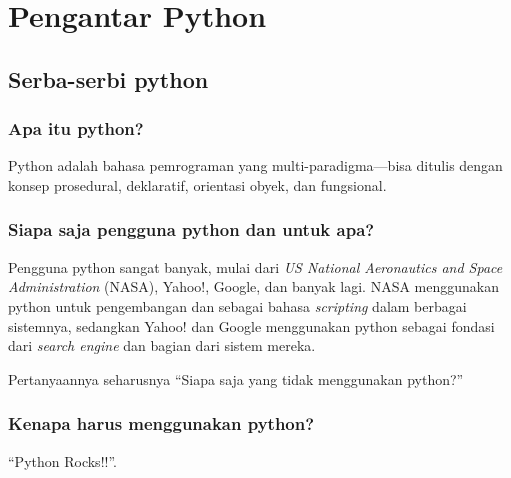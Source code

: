 \chapter{Pengantar Python}

\section{Serba-serbi python}
\subsection{Apa itu python?}
Python adalah bahasa pemrograman yang multi-paradigma---bisa ditulis dengan konsep prosedural, deklaratif, orientasi obyek, dan fungsional. 

\subsection{Siapa saja pengguna python dan untuk apa?}
Pengguna python sangat banyak, mulai dari \textit{US National Aeronautics and Space Administration} (NASA), Yahoo!, Google, dan banyak lagi. NASA menggunakan python untuk pengembangan dan sebagai bahasa \textit{scripting} dalam berbagai sistemnya, sedangkan Yahoo! dan Google menggunakan python sebagai fondasi dari \textit{search engine} dan bagian dari sistem mereka.

Pertanyaannya seharusnya ``Siapa saja yang tidak menggunakan python?''

\subsection{Kenapa harus menggunakan python?}
``Python Rocks!!''. 


